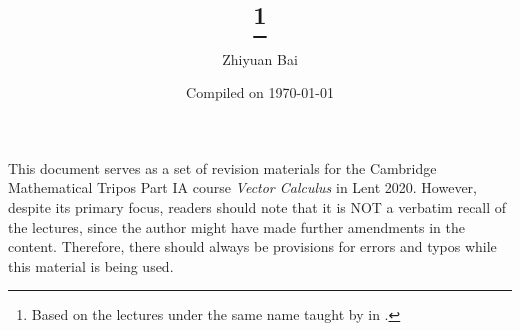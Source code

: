 \documentclass[a4paper]{article}
\title{\triposcourse{}
\thanks{Based on the lectures under the same name taught by \triposlecturer{} in \triposterm{}.}}
\author{Zhiyuan Bai}
\date{Compiled on \today}
\newcommand{\triposcourse}{Vector Calculus}
\newcommand{\triposterm}{Lent 2020}
\newcommand{\tripospart}{IA}
\theoremstyle{plain}
\theoremstyle{definition}
\theoremstyle{remark}
\begin{document}
    \maketitle
    This document serves as a set of revision materials for the Cambridge Mathematical Tripos Part \tripospart{} course \textit{\triposcourse{}} in \triposterm{}.
    However, despite its primary focus, readers should note that it is NOT a verbatim recall of the lectures, since the author might have made further amendments in the content.
    Therefore, there should always be provisions for errors and typos while this material is being used.
    \tableofcontents
    
    
    
    
    
    
    
    
    
    
    
    
    
    
    
    
    
\end{document}
